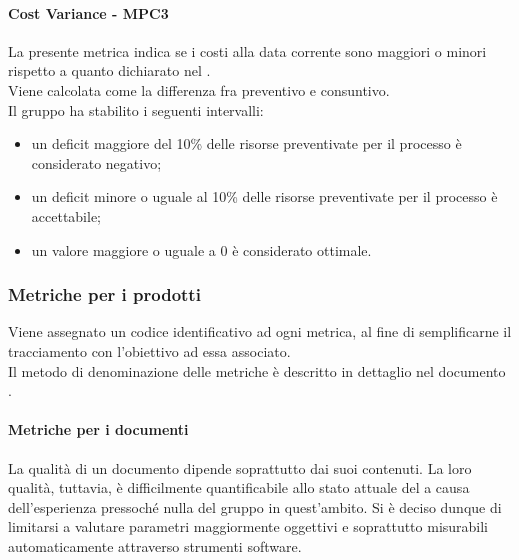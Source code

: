 \documentclass[PianoDiQualifica.tex]{subfiles}
\begin{document}
			\hypertarget{Cost_m}{\paragraph{Cost Variance - MPC3}}
			La presente metrica indica se i costi alla data corrente sono maggiori o minori rispetto a quanto dichiarato nel \PPdocRR{}. \\
			Viene calcolata come la differenza fra preventivo e consuntivo. \\
			Il gruppo ha stabilito i seguenti intervalli:
			\begin{itemize}
				\item un deficit maggiore del 10\% delle risorse preventivate per il processo è considerato negativo;
				\item un deficit minore o uguale al 10\% delle risorse preventivate per il processo è accettabile;
				\item un valore maggiore o uguale a 0 è considerato ottimale.
			\end{itemize}
			
		\subsubsection{Metriche per i prodotti}
		Viene assegnato un codice identificativo ad ogni metrica, al fine di semplificarne il tracciamento con l'obiettivo ad essa associato. \\
		Il metodo di denominazione delle metriche è descritto in dettaglio nel documento \NPdocRR{}.
		
			\paragraph{Metriche per i documenti}
			La qualità di un documento dipende soprattutto dai suoi contenuti. La loro qualità, tuttavia, è difficilmente quantificabile allo stato attuale del  a causa
			dell’esperienza pressoché nulla del gruppo in quest’ambito. Si è deciso dunque di limitarsi a valutare parametri maggiormente oggettivi e soprattutto misurabili automaticamente
			attraverso strumenti software.
			
\end{document}
